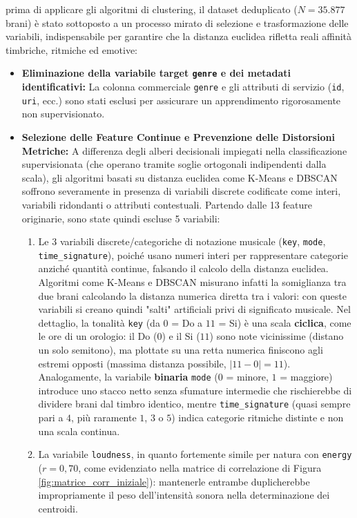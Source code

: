 prima di applicare gli algoritmi di clustering, il dataset deduplicato ($N = 35.877$ brani) è stato sottoposto a un processo mirato di selezione e trasformazione delle variabili, indispensabile per garantire che la distanza euclidea rifletta reali affinità timbriche, ritmiche ed emotive:
\begin{itemize}
    \item \textbf{Eliminazione della variabile target \texttt{genre} e dei metadati identificativi:} La colonna commerciale \texttt{genre} e gli attributi di servizio (\texttt{id}, \texttt{uri}, ecc.) sono stati esclusi per assicurare un apprendimento rigorosamente non supervisionato.
    \item \textbf{Selezione delle Feature Continue e Prevenzione delle Distorsioni Metriche:} A differenza degli alberi decisionali impiegati nella classificazione supervisionata (che operano tramite soglie ortogonali indipendenti dalla scala), gli algoritmi basati su distanza euclidea come K-Means e DBSCAN soffrono severamente in presenza di variabili discrete codificate come interi, variabili ridondanti o attributi contestuali. Partendo dalle 13 feature originarie, sono state quindi escluse 5 variabili:
    \begin{enumerate}
        \item Le 3 variabili discrete/categoriche di notazione musicale (\texttt{key}, \texttt{mode}, \texttt{time\_signature}), poiché usano numeri interi per rappresentare categorie anziché quantità continue, falsando il calcolo della distanza euclidea. Algoritmi come K-Means e DBSCAN misurano infatti la somiglianza tra due brani calcolando la distanza numerica diretta tra i valori: con queste variabili si creano quindi "salti" artificiali privi di significato musicale. Nel dettaglio, la tonalità \texttt{key} (da $0$ = Do a $11$ = Si) è una scala \textbf{ciclica}, come le ore di un orologio: il Do ($0$) e il Si ($11$) sono note vicinissime (distano un solo semitono), ma plottate su una retta numerica finiscono agli estremi opposti (massima distanza possibile, $|11 - 0| = 11$). Analogamente, la variabile \textbf{binaria} \texttt{mode} ($0$ = minore, $1$ = maggiore) introduce uno stacco netto senza sfumature intermedie che rischierebbe di dividere brani dal timbro identico, mentre \texttt{time\_signature} (quasi sempre pari a $4$, più raramente $1$, $3$ o $5$) indica categorie ritmiche distinte e non una scala continua.
        \item La variabile \texttt{loudness}, in quanto fortemente simile per natura con \texttt{energy} ($r = 0,70$, come evidenziato nella matrice di correlazione di Figura \ref{fig:matrice_corr_iniziale}): mantenerle entrambe duplicherebbe impropriamente il peso dell'intensità sonora nella determinazione dei centroidi.

\end{enumerate}
\end{itemize}
